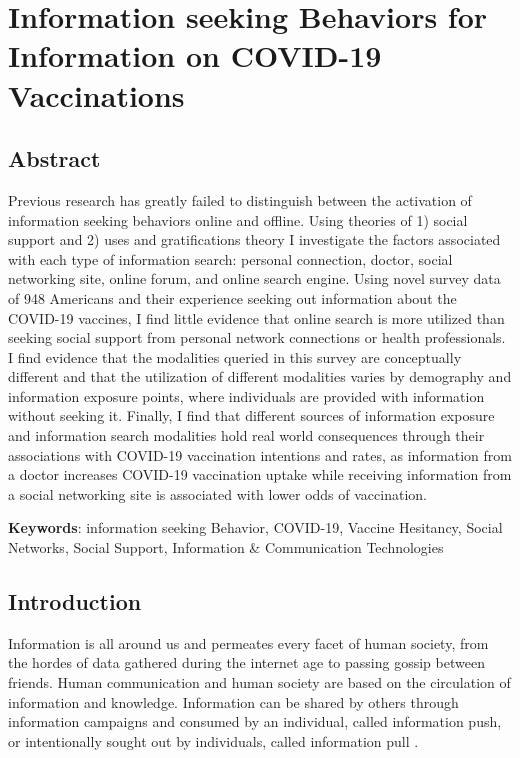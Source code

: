 \hypertarget{paper-2}{\chapter{Information seeking Behaviors for Information on COVID-19 Vaccinations}\label{paper-2}}

\hypertarget{abstract}{\section{Abstract}\label{abstract}}

Previous research has greatly failed to distinguish between the activation of
information seeking behaviors online and offline. Using theories of 1) social
support and 2) uses and gratifications theory I investigate the factors
associated with each type of information search: 
personal connection, doctor, social networking site, online forum, and online
search engine. Using novel survey data of 948 Americans and their experience
seeking out information about the COVID-19 vaccines, I find little evidence that
online search is more utilized than seeking social support from personal network
connections or health professionals. I find evidence that the modalities queried
in this survey are conceptually different and that the utilization of different
modalities varies by demography and information exposure points, where
individuals are provided with information without seeking it. Finally, I find that
different sources of information exposure and information search modalities hold
real world consequences through their associations with COVID-19 vaccination
intentions and rates, as information from a doctor increases COVID-19
vaccination uptake while receiving information from a social networking site
is associated with lower odds of vaccination.

\textbf{Keywords}: information seeking Behavior, COVID-19, Vaccine Hesitancy, Social Networks, Social Support, Information \& Communication Technologies

\hypertarget{intro-1}{\section{Introduction}\label{intro-1}}

Information is all around us and permeates every facet of human society, from
the hordes of data gathered during the internet age to passing gossip between
friends. Human communication and human society are based on the circulation of
information and knowledge. Information can be shared by others through
information campaigns and consumed by an individual, called information push, or
intentionally sought out by individuals, called information pull
\citep{cybenkoFoundationsInformationPush1999}.

